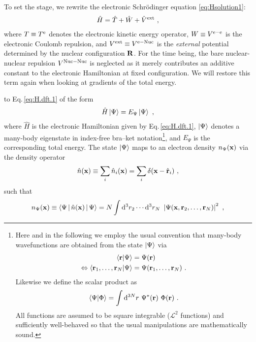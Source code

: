 To set the stage, we rewrite the electronic Schr\"odinger equation \eqref{eq:Hsolution1}:
\begin{align}
	\hat H = \hat T + \hat W + \hat V^{\rm ext}~,
	\label{eq:H.dft.1}
\end{align}
where $T \equiv T^{\rm e}$ denotes the electronic kinetic energy operator, $W \equiv V^{\rm e-e}$ is the electronic Coulomb repulsion, and $V^{\rm ext} \equiv V^{\rm e-Nuc}$ is the \emph{external} potential determined by the nuclear configuration $\bf R$. For the time being, the bare nuclear-nuclear repulsion $V^{\rm Nuc-Nuc}$ is neglected as it merely contributes an additive constant to the electronic Hamiltonian at fixed configuration. We will restore this term again when looking at gradients of the total energy.

 to Eq.\,\eqref{eq:H.dft.1} of the form
\begin{align}
	\hat H \Ket{\Psi} = E_\Psi \Ket{\Psi}~,
	\label{eq:SE.dft.1}
\end{align}
where $\hat H$ is the electronic Hamiltonian given by Eq.\,\eqref{eq:H.dft.1}, $\Ket{\Psi}$ denotes a many-body eigenstate in index-free bra--ket notation\footnote{
	Here and in the following we employ the usual convention that many-body wavefunctions are obtained from the state $\Ket{\Psi}$ via
	\begin{align*}
		\braket{{\bf r} | \Psi} 
			&= \Psi ({\bf r}) \\
		\Leftrightarrow
		\braket{{\bf r}_1, \ldots, {\bf r}_N | \Psi} 
			&= \Psi({\bf r}_1, \ldots, {\bf r}_N)~.
	\end{align*}
	Likewise we define the scalar product as
	$$
	\braket{\Psi | \Phi} = \int {\rm d}^{3N} r ~ \Psi^\ast ({\bf r}) \ \Phi({\bf r})~.
	$$
	All functions are assumed to be square integrable ($\mathcal{L}^2$ functions) and sufficiently well-behaved so that the usual manipulations are mathematically sound.
},
and $E_\Psi$ is the corresponding total energy.
The state $\Ket{\Psi}$ maps to an electron density $n_\Psi ({\bf x})$ via the density operator
\begin{align}
	\hat n ({\bf x}) \equiv \sum_i \hat n_i ({\bf x}) = \sum_i \delta ({\bf x} - \hat{\bf r}_i)~,
	\label{eq:densop}
\end{align}
such that
\begin{align}
	n_\Psi({\bf x}) 
	\equiv \Braket{\Psi | \hat n({\bf x}) | \Psi} 
	= N \int {\rm d}^3 r_2 \cdots {\rm d}^3 r_{N} ~ 
	\left\lvert 
	\Psi ({\bf x}, {\bf r}_2, \ldots, {\bf r}_N) 
	\right\rvert^2~,
\end{align}
